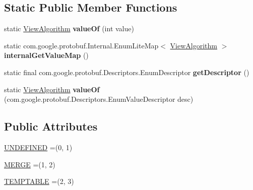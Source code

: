 \subsection*{Static Public Member Functions}
\begin{DoxyCompactItemize}
\item 
\mbox{\label{enumcom_1_1mysql_1_1cj_1_1x_1_1protobuf_1_1_mysqlx_crud_1_1_view_algorithm_ab1795006b603890529a4d01d518c20bc}} 
static \mbox{\hyperlink{enumcom_1_1mysql_1_1cj_1_1x_1_1protobuf_1_1_mysqlx_crud_1_1_view_algorithm}{View\+Algorithm}} {\bfseries value\+Of} (int value)
\item 
\mbox{\label{enumcom_1_1mysql_1_1cj_1_1x_1_1protobuf_1_1_mysqlx_crud_1_1_view_algorithm_a8d9fe19135fa33610fb35f515b97625d}} 
static com.\+google.\+protobuf.\+Internal.\+Enum\+Lite\+Map$<$ \mbox{\hyperlink{enumcom_1_1mysql_1_1cj_1_1x_1_1protobuf_1_1_mysqlx_crud_1_1_view_algorithm}{View\+Algorithm}} $>$ {\bfseries internal\+Get\+Value\+Map} ()
\item 
\mbox{\label{enumcom_1_1mysql_1_1cj_1_1x_1_1protobuf_1_1_mysqlx_crud_1_1_view_algorithm_ac9a20c67de035b5d3c8169080c5115ea}} 
static final com.\+google.\+protobuf.\+Descriptors.\+Enum\+Descriptor {\bfseries get\+Descriptor} ()
\item 
\mbox{\label{enumcom_1_1mysql_1_1cj_1_1x_1_1protobuf_1_1_mysqlx_crud_1_1_view_algorithm_aa9d214e7f8a1f82928ec69c9c50038b8}} 
static \mbox{\hyperlink{enumcom_1_1mysql_1_1cj_1_1x_1_1protobuf_1_1_mysqlx_crud_1_1_view_algorithm}{View\+Algorithm}} {\bfseries value\+Of} (com.\+google.\+protobuf.\+Descriptors.\+Enum\+Value\+Descriptor desc)
\end{DoxyCompactItemize}
\subsection*{Public Attributes}
\begin{DoxyCompactItemize}
\item 
\mbox{\hyperlink{enumcom_1_1mysql_1_1cj_1_1x_1_1protobuf_1_1_mysqlx_crud_1_1_view_algorithm_a70fb3167cb44c1401adaff0d980c3d82}{U\+N\+D\+E\+F\+I\+N\+ED}} =(0, 1)
\item 
\mbox{\hyperlink{enumcom_1_1mysql_1_1cj_1_1x_1_1protobuf_1_1_mysqlx_crud_1_1_view_algorithm_a907c96cff62b15728e6a78d9493e5bdb}{M\+E\+R\+GE}} =(1, 2)
\item 
\mbox{\hyperlink{enumcom_1_1mysql_1_1cj_1_1x_1_1protobuf_1_1_mysqlx_crud_1_1_view_algorithm_a4b9642108ad6345842ac84139a9e9183}{T\+E\+M\+P\+T\+A\+B\+LE}} =(2, 3)
\end{DoxyCompactItemize}

